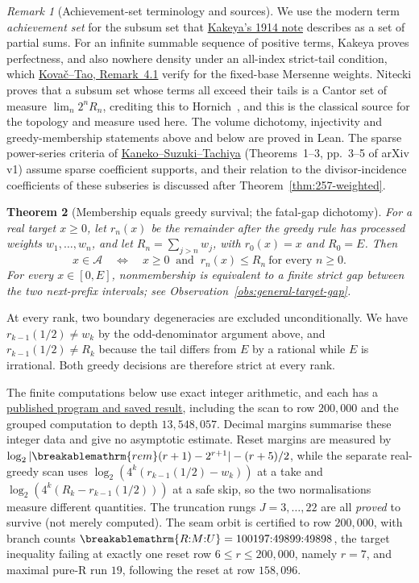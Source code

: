 \documentclass[11pt]{article}
\theoremstyle{plain}
\newtheorem{thm}{Theorem}[section]
\theoremstyle{definition}
\theoremstyle{remark}
\newtheorem{rem}[thm]{Remark}
\renewcommand{\mathrm}[1]{\ifmmode\breakablemathrm{#1}\else\textrm{#1}\fi}%
\begin{document}
\begin{rem}[Achievement-set terminology and sources]
We use the modern term \emph{achievement set} for the subsum set that
\href{https://doi.org/10.11429/ptmps1907.7.14_250}{Kakeya's 1914 note} describes
as a set of partial sums.  For an infinite summable sequence of positive
terms, Kakeya proves perfectness, and also nowhere density under an
all-index strict-tail condition, which
\href{https://arxiv.org/abs/2406.17593v4}{Kova\v{c}--Tao,
Remark~4.1} verify for the fixed-base Mersenne weights. Nitecki proves
that a subsum set whose terms all exceed their tails is a Cantor set of
measure $\lim_n2^nR_n$, crediting this to
Hornich~\cite[Theorem~4(1), p.~9]{nitecki2013}, and this is the classical
source for the topology and measure used here. The volume dichotomy,
injectivity and greedy-membership statements above and below are proved
in Lean.  The sparse power-series criteria
of \href{https://arxiv.org/abs/2601.20743}{Kaneko--Suzuki--Tachiya}
(Theorems~1--3, pp.~3--5 of arXiv v1) assume sparse coefficient supports,
and their relation to the divisor-incidence coefficients of these
subseries is discussed after Theorem~\ref{thm:257-weighted}.
\end{rem}

\begin{thm}[Membership equals greedy survival; the fatal-gap dichotomy]
\label{thm:greedy-survival}
For a real target $x\ge0$, let $r_n(x)$ be the remainder after the
greedy rule has processed weights $w_1,\ldots,w_n$, and let
$R_n=\sum_{j>n}w_j$, with $r_0(x)=x$ and $R_0=E$.  Then
\[
 x\in\mathcal A\quad\Longleftrightarrow\quad
 x\ge0\ \text{ and }\ r_n(x)\le R_n\ \text{for every }n\ge0.
\]
For every $x\in[0,E]$, nonmembership is equivalent to a finite
strict gap between the two next-prefix intervals; see
Observation~\ref{obs:general-target-gap}.
\end{thm}

At every rank, two boundary degeneracies are excluded unconditionally. We have
$r_{k-1}(1/2)\ne w_k$ by the odd-denominator argument above, and $r_{k-1}(1/2)\ne R_k$
because the tail differs from $E$ by a rational while $E$ is irrational. Both greedy decisions are therefore strict at every rank.

The finite computations below use exact integer arithmetic, and each has a
\href{https://github.com/wcook04/plectis-erdos/tree/f757115e03bebe5c04431a147da559015c680a37/research/experiments/erdos257}{published program and saved result},
including the scan to row $200{,}000$ and the grouped computation to
depth $13{,}548{,}057$. Decimal margins summarise these integer data and
give no asymptotic estimate. Reset margins are measured by
$\log_2|\mathrm{rem}(r+1)-2^{r+1}|-(r+5)/2$, while the separate
real-greedy scan uses $\log_2(4^k(r_{k-1}(1/2)-w_k))$ at a take and
$\log_2(4^k(R_k-r_{k-1}(1/2)))$ at a safe skip, so the two normalisations
measure different quantities. The truncation rungs $J = 3,\dots,22$ are all
\emph{proved} to survive (not merely computed). The seam orbit is
certified to row $200{,}000$, with branch counts
$\mathrm{R{:}M{:}U} = 100197{:}49899{:}49898$, the target inequality
failing at exactly one reset row $6\le r\le200{,}000$, namely $r = 7$, and
maximal pure-R run $19$, following the reset at row $158{,}096$.
\end{document}
